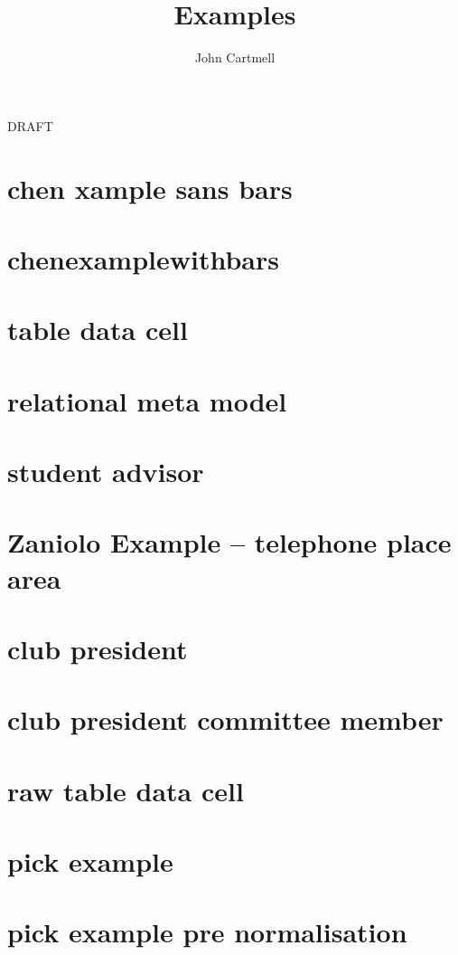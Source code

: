 \documentclass[10pt,a4paper]{article}
\begin{document}
\title{Examples}


\author{John Cartmell}

\maketitle
\begin{center}
DRAFT
\end{center}

\section{chen xample sans bars}


\section{chenexamplewithbars}


\section{table data cell}


\section{relational meta model}


\section{student advisor}


\section{Zaniolo Example -- telephone place area}


\section{club president}


\section{club president committee member}


\section{raw table data cell}


\section{pick example}


\section{pick example pre normalisation}


	 
\end{document}

